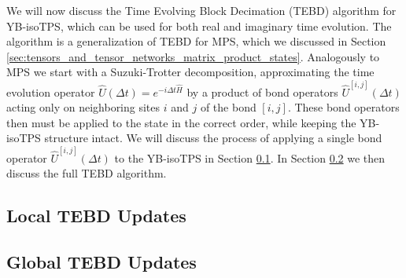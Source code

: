 We will now discuss the Time Evolving Block Decimation (TEBD) algorithm for YB-isoTPS, which can be used for both real and imaginary time evolution. The algorithm is a generalization of TEBD for MPS, which we discussed in Section \ref{sec:tensors_and_tensor_networks_matrix_product_states}. Analogously to MPS we start with a Suzuki-Trotter decomposition, approximating the time evolution operator $\hat{U}\left(\Delta t\right) = e^{-i\Delta t \hat{H}}$ by a product of bond operators $\hat{U}^{[i, j]}\left(\Delta t\right)$ acting only on neighboring sites $i$ and $j$ of the bond $[i, j]$. These bond operators then must be applied to the state in the correct order, while keeping the YB-isoTPS structure intact. We will discuss the process of applying a single bond operator $\hat{U}^{[i, j]}\left(\Delta t\right)$ to the YB-isoTPS in Section \ref{sec:YB_isoTPS_TEBD_local_updates}. In Section \ref{sec:YB_isoTPS_TEBD_global_updates} we then discuss the full TEBD algorithm.

\subsection{Local TEBD Updates}
\label{sec:YB_isoTPS_TEBD_local_updates}


\subsection{Global TEBD Updates}
\label{sec:YB_isoTPS_TEBD_global_updates}
